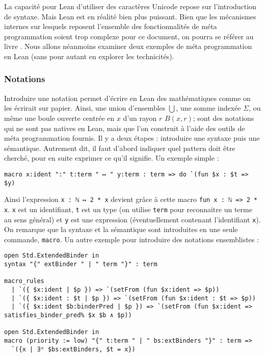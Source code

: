 \documentclass[a4paper, 12pt]{article}
\newcommand{\lean}[1]{\texttt{#1}}
\begin{document}
La capacité pour Lean d'utiliser des caractères Unicode repose sur l'introduction de syntaxe. Mais Lean est en réalité bien plus puissant. Bien que les mécanismes internes sur lesquels reposent l'ensemble des fonctionnalités de méta programmation soient trop complexe pour ce document, on pourra se référer au livre \cite{meta_lean}. Nous allons néanmoins examiner deux exemples de méta programmation en Lean (sans pour autant en explorer les technicités).

\subsubsection{Notations}

Introduire une notation permet d'écrire en Lean des mathématiques comme on les écrirait sur papier. Ainsi, une union d'ensembles $\bigcup$, une somme indexée $\Sigma$, ou même une boule ouverte centrée en $x$ d'un rayon $r$ $B(x, r)$; sont des notations qui ne sont pas natives en Lean, mais que l'on construit à l'aide des outils de méta programmation fournis. Il y a deux étapes : introduire une syntaxe puis une sémantique. Autrement dit, il faut d'abord indiquer quel pattern doit être cherché, pour en suite exprimer ce qu'il signifie. Un exemple simple :

\begin{verbatim}
macro x:ident ":" t:term " ↦ " y:term : term => do `(fun $x : $t => $y)
\end{verbatim}

Ainsi l'expression \lean{x : ℕ ↦ 2 * x} devient grâce à cette macro \lean{fun x : ℕ => 2 * x}. \lean{x} est un identifiant, \lean{t} est un type (on utilise \lean{term} pour reconnaitre un terme au sens général) et \lean{y} est une expression (éventuellement contenant l'identifiant \lean{x}). On remarque que la syntaxe et la sémantique sont introduites en une seule commande, \lean{macro}. Un autre exemple pour introduire des notations ensemblistes :

\begin{verbatim}
open Std.ExtendedBinder in
syntax "{" extBinder " | " term "}" : term

macro_rules
  | `({ $x:ident | $p }) => `(setFrom (fun $x:ident => $p))
  | `({ $x:ident : $t | $p }) => `(setFrom (fun $x:ident : $t => $p))
  | `({ $x:ident $b:binderPred | $p }) => `(setFrom (fun $x:ident => satisfies_binder_pred% $x $b ∧ $p))

open Std.ExtendedBinder in
macro (priority := low) "{" t:term " | " bs:extBinders "}" : term =>
  `({x | ∃ᵉ $bs:extBinders, $t = x})
\end{verbatim}
\end{document}
